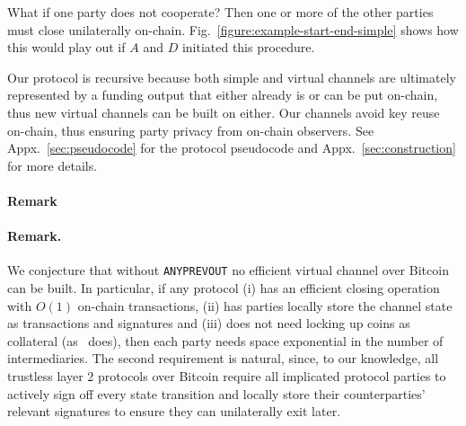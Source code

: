   What if one party does not cooperate? Then one or more of the other parties must close
  unilaterally on-chain. Fig.~\ref{figure:example-start-end-simple} shows how
  this would play out if $A$ and $D$ initiated this procedure.

  Our protocol is recursive because both simple and virtual channels are
  ultimately represented by a funding output that either already is or can be put
  on-chain, thus new virtual channels can be built on either.
  Our channels avoid key reuse on-chain, thus ensuring party
  privacy from on-chain observers.
  See Appx.~\ref{sec:pseudocode} for the protocol pseudocode and Appx.~\ref{sec:construction} for more details.

  \makeatletter%
    {\paragraph{Remark}}%
    {\paragraph{Remark.}}%
  \makeatother%
We conjecture that without
  \texttt{ANYPREVOUT} no efficient virtual channel
  over Bitcoin can be built. In particular, if any protocol
  (i) has an efficient closing operation with $O(1)$ on-chain
  transactions, (ii) has parties locally store the channel state as transactions and
  signatures and (iii) does not need locking up
  coins as collateral (as~\cite{donner} does), then each party needs space exponential
  in the number of intermediaries. The second
  requirement is natural, since, to our knowledge, all trustless layer $2$
  protocols over Bitcoin require all implicated protocol parties to actively
  sign off every state transition and locally store their counterparties' relevant
  signatures to ensure they can unilaterally exit later.
